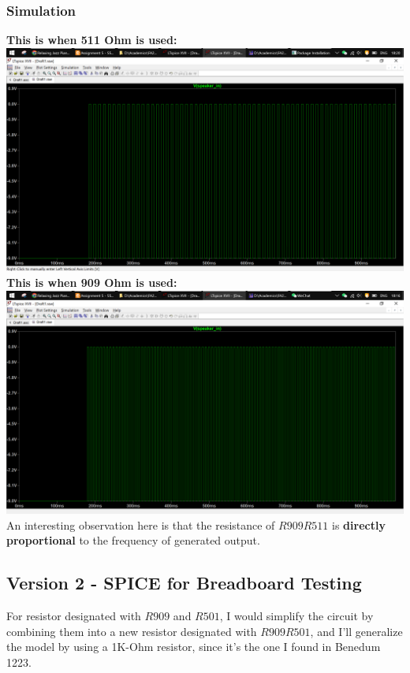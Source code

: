 \documentclass{article}
\begin{document}
	\subsubsection{Simulation}
	\textbf{This is when 511 Ohm is used: }\newline
	\includegraphics[width=\columnwidth]{LTSP_PCB_SIMU_511}
	\textbf{This is when 909 Ohm is used: }\newline
	\includegraphics[width=\columnwidth]{LTSP_PCB_SIMU}
	An interesting observation here is that the resistance of $ R909R511 $ is \textbf{directly proportional} to the frequency of generated output.
	\subsection{Version 2 - SPICE for Breadboard Testing}
	For resistor designated with $ R909 $ and $ R501 $, I would simplify the circuit by combining them into a new resistor designated with $ R909R501 $, and I'll generalize the model by using a 1K-Ohm resistor, since it's the one I found in Benedum 1223. \newline
\end{document}
